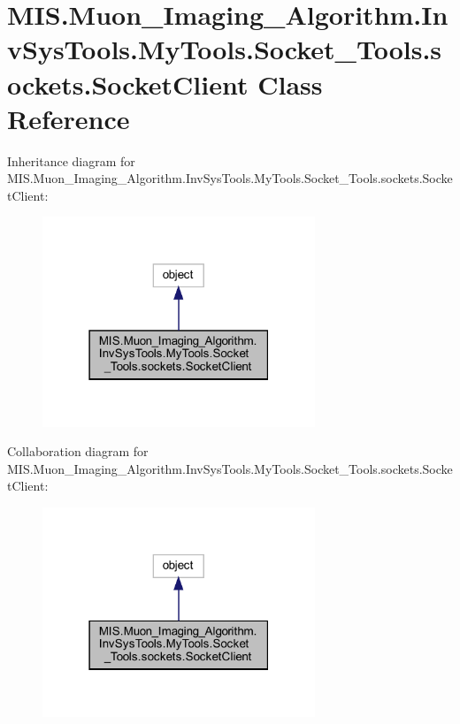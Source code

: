 \hypertarget{classMIS_1_1Muon__Imaging__Algorithm_1_1InvSysTools_1_1MyTools_1_1Socket__Tools_1_1sockets_1_1SocketClient}{}\section{M\+I\+S.\+Muon\+\_\+\+Imaging\+\_\+\+Algorithm.\+Inv\+Sys\+Tools.\+My\+Tools.\+Socket\+\_\+\+Tools.\+sockets.\+Socket\+Client Class Reference}
\label{classMIS_1_1Muon__Imaging__Algorithm_1_1InvSysTools_1_1MyTools_1_1Socket__Tools_1_1sockets_1_1SocketClient}


Inheritance diagram for M\+I\+S.\+Muon\+\_\+\+Imaging\+\_\+\+Algorithm.\+Inv\+Sys\+Tools.\+My\+Tools.\+Socket\+\_\+\+Tools.\+sockets.\+Socket\+Client\+:
\nopagebreak
\begin{figure}[H]
\begin{center}
\leavevmode
\includegraphics[width=231pt]{classMIS_1_1Muon__Imaging__Algorithm_1_1InvSysTools_1_1MyTools_1_1Socket__Tools_1_1sockets_1_1SocketClient__inherit__graph}
\end{center}
\end{figure}


Collaboration diagram for M\+I\+S.\+Muon\+\_\+\+Imaging\+\_\+\+Algorithm.\+Inv\+Sys\+Tools.\+My\+Tools.\+Socket\+\_\+\+Tools.\+sockets.\+Socket\+Client\+:
\nopagebreak
\begin{figure}[H]
\begin{center}
\leavevmode
\includegraphics[width=231pt]{classMIS_1_1Muon__Imaging__Algorithm_1_1InvSysTools_1_1MyTools_1_1Socket__Tools_1_1sockets_1_1SocketClient__coll__graph}
\end{center}
\end{figure}
